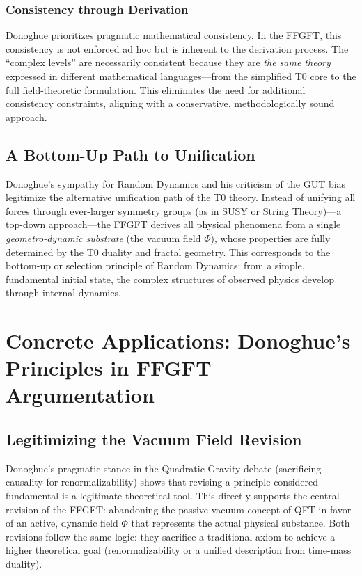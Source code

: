 	\subsubsection{Consistency through Derivation}
	Donoghue prioritizes pragmatic mathematical consistency. In the FFGFT, this consistency is not enforced ad hoc but is inherent to the derivation process. The ``complex levels'' are necessarily consistent because they are \emph{the same theory} expressed in different mathematical languages—from the simplified T0 core to the full field-theoretic formulation. This eliminates the need for additional consistency constraints, aligning with a conservative, methodologically sound approach.
	
	\subsection{A Bottom-Up Path to Unification}
	
	Donoghue's sympathy for Random Dynamics and his criticism of the GUT bias legitimize the alternative unification path of the T0 theory. Instead of unifying all forces through ever-larger symmetry groups (as in SUSY or String Theory)—a top-down approach—the FFGFT derives all physical phenomena from a single \emph{geometro-dynamic substrate} (the vacuum field $\Phi$), whose properties are fully determined by the T0 duality and fractal geometry. This corresponds to the bottom-up or selection principle of Random Dynamics: from a simple, fundamental initial state, the complex structures of observed physics develop through internal dynamics.
	
	\section{Concrete Applications: Donoghue's Principles in FFGFT Argumentation}
	
	\subsection{Legitimizing the Vacuum Field Revision}
	Donoghue's pragmatic stance in the Quadratic Gravity debate (sacrificing causality for renormalizability) shows that revising a principle considered fundamental is a legitimate theoretical tool. This directly supports the central revision of the FFGFT: abandoning the passive vacuum concept of QFT in favor of an active, dynamic field $\Phi$ that represents the actual physical substance. Both revisions follow the same logic: they sacrifice a traditional axiom to achieve a higher theoretical goal (renormalizability or a unified description from time-mass duality).
	
